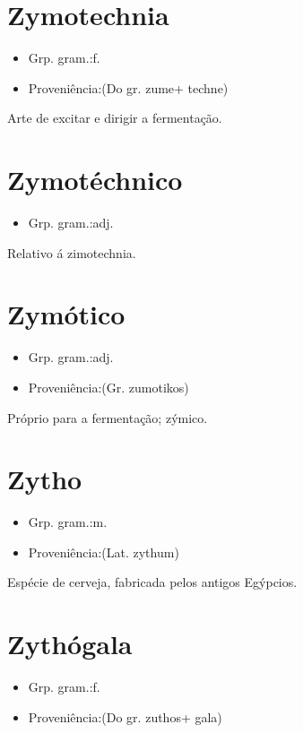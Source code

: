 \section{Zymotechnia}
\begin{itemize}
\item {Grp. gram.:f.}
\end{itemize}
\begin{itemize}
\item {Proveniência:(Do gr. \textunderscore zume\textunderscore  + \textunderscore techne\textunderscore )}
\end{itemize}
Arte de excitar e dirigir a fermentação.
\section{Zymotéchnico}
\begin{itemize}
\item {Grp. gram.:adj.}
\end{itemize}
Relativo á zimotechnia.
\section{Zymótico}
\begin{itemize}
\item {Grp. gram.:adj.}
\end{itemize}
\begin{itemize}
\item {Proveniência:(Gr. \textunderscore zumotikos\textunderscore )}
\end{itemize}
Próprio para a fermentação; zýmico.
\section{Zytho}
\begin{itemize}
\item {Grp. gram.:m.}
\end{itemize}
\begin{itemize}
\item {Proveniência:(Lat. \textunderscore zythum\textunderscore )}
\end{itemize}
Espécie de cerveja, fabricada pelos antigos Egýpcios.
\section{Zythógala}
\begin{itemize}
\item {Grp. gram.:f.}
\end{itemize}
\begin{itemize}
\item {Proveniência:(Do gr. \textunderscore zuthos\textunderscore  + \textunderscore gala\textunderscore )}
\end{itemize}
